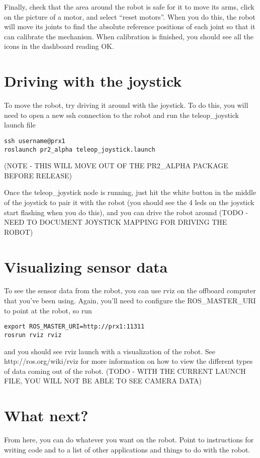 Finally, check that the area around the robot is safe for it to move its arms, click on the picture of a motor, and select ``reset motors''.  When you do this, the robot will move its joints to find the absolute reference positions of each joint so that it can calibrate the mechanism.  When calibration is finished, you should see all the icons in the dashboard reading OK.
\section{Driving with the joystick}
To move the robot, try driving it around with the joystick.  To do this, you will need to open a new ssh connection to the robot and run the teleop\_joystick launch file
\begin{verbatim}
ssh username@prx1
roslaunch pr2_alpha teleop_joystick.launch
\end{verbatim}
(NOTE - THIS WILL MOVE OUT OF THE PR2\_ALPHA PACKAGE BEFORE RELEASE)

Once the teleop\_joystick node is running, just hit the white button in the middle of the joystick to pair it with the robot (you should see the 4 leds on the joystick start flashing when you do this), and you can drive the robot around (TODO - NEED TO DOCUMENT JOYSTICK MAPPING FOR DRIVING THE ROBOT)
\section{Visualizing sensor data}
To see the sensor data from the robot, you can use rviz on the offboard computer that you've been using.  Again, you'll need to configure the ROS\_MASTER\_URI to point at the robot, so run
\begin{verbatim}
export ROS_MASTER_URI=http://prx1:11311
rosrun rviz rviz
\end{verbatim}
and you should see rviz launch with a visualization of the robot.  See http://ros.org/wiki/rviz for more information on how to view the different types of data coming out of the robot.
(TODO - WITH THE CURRENT LAUNCH FILE, YOU WILL NOT BE ABLE TO SEE CAMERA DATA)

\section{What next?}
From here, you can do whatever you want on the robot.  Point to instructions for writing code and to a list of other applications and things to do with the robot.
